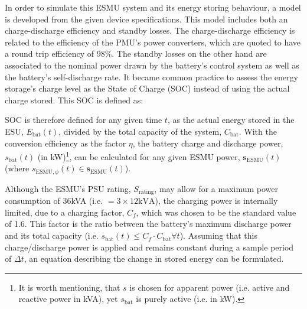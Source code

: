 In order to simulate this ESMU system and its energy storing behaviour, a model is developed from the given device specifications.
This model includes both an charge-discharge efficiency and standby losses.
The charge-discharge efficiency is related to the efficiency of the PMU's power converters, which are quoted to have a round trip efficiency of 98\%.
The standby losses on the other hand are associated to the nominal power drawn by the battery's control system as well as the battery's self-discharge rate.
It became common practice to assess the energy storage's charge level as the State of Charge (SOC) instead of using the actual charge stored.
This SOC is defined as:



\nomenclature[I]{$\eta$}{Round-trip efficiency of power electronics, where $\eta \in (0, 1]$ (Chapter \ref{ch1})}


SOC is therefore defined for any given time $t$, as the actual energy stored in the ESU, $E_\text{bat}(t)$, divided by the total capacity of the system, $C_\text{bat}$.
With the conversion efficiency as the factor $\eta$, the battery charge and discharge power, $s_\text{bat}(t)$ (in kW)\footnote[1]{It is worth mentioning, that $s$ is chosen for apparent power (i.e. active and reactive power in kVA), yet $s_\text{bat}$ is purely active (i.e. in kW).}, can be calculated for any given ESMU power, $\textbf{s}_\text{ESMU}(t)$ (where $s_{\text{ESMU},\phi}(t) \in \textbf{s}_\text{ESMU}(t)$).




Although the ESMU's PSU rating, $S_\text{rating}$, may allow for a maximum power consumption of 36kVA (i.e. $=3\times12\text{kVA}$), the charging power is internally limited, due to a charging factor, $C_f$, which was chosen to be the standard value of 1.6.
This factor is the ratio between the battery's maximum discharge power and its total capacity (i.e. $s_\text{bat}(t) \leq C_f \cdot C_\text{bat} \forall t$).
Assuming that this charge/discharge power is applied and remains constant during a sample period of $\Delta t$, an equation describing the change in stored energy can be formulated.

